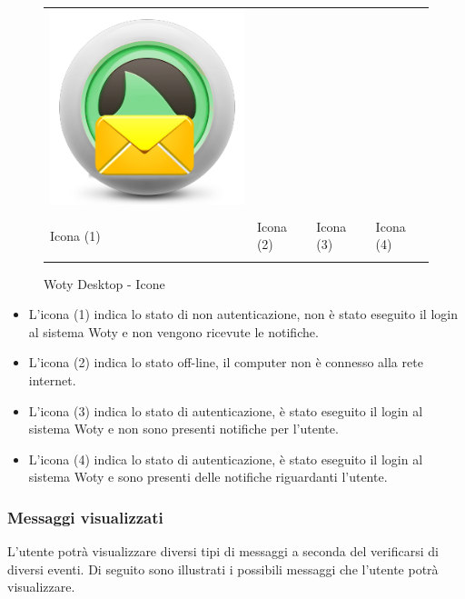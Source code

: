 \begin{center}
\begin{figure}[H]
\begin{tabular}{ m{1.5cm} m{1.5cm} m{1.5cm} m{1.5cm} }
\includegraphics[scale=0.14]{images/wotyDesktop/icons/ico0.png} \\
\multicolumn{4}{r}{ \vspace*{0.2cm} }\\
Icona (1) & Icona (2) & Icona (3) & Icona (4) \\
\multicolumn{4}{r}{ \vspace*{0.2cm} }\\
\end{tabular}
\caption{Woty Desktop - Icone}
\label{wd-icone}
\end{figure}
\end{center}



\begin{itemize}


\item L'icona (1) indica lo stato di non autenticazione, non è stato eseguito il login al sistema Woty e non vengono ricevute le notifiche.

\item L'icona (2) indica lo stato off-line, il computer non è connesso alla rete internet.

\item L'icona (3) indica lo stato di autenticazione, è stato eseguito il login al sistema Woty e non sono presenti notifiche per l'utente.

\item L'icona (4) indica lo stato di autenticazione, è stato eseguito il login al sistema Woty e sono presenti delle notifiche riguardanti l'utente.
\end{itemize}

\subsubsection{Messaggi visualizzati}
L'utente potrà visualizzare diversi tipi di messaggi a seconda del verificarsi di diversi eventi.
Di seguito sono illustrati i possibili messaggi che l'utente potrà visualizzare.


